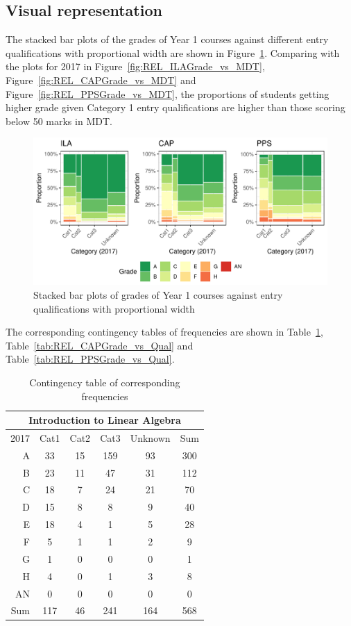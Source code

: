 \documentclass[a4paper]{report}
\begin{document}
\subsection{Visual representation}

The stacked bar plots of the grades of Year 1 courses against different entry qualifications with proportional width are shown in Figure~\ref{fig:REL_Grade_vs_Qual}. Comparing with the plots for 2017 in Figure~\ref{fig:REL_ILAGrade_vs_MDT}, Figure~\ref{fig:REL_CAPGrade_vs_MDT} and Figure~\ref{fig:REL_PPSGrade_vs_MDT}, the proportions of students getting higher grade given Category 1 entry qualifications are higher than those scoring below 50 marks in MDT. 

\begin{figure}[H]
  \centering
  \includegraphics[width=\linewidth]{fig/REL_Grade_vs_Qual.pdf}
  \caption{\label{fig:REL_Grade_vs_Qual}Stacked bar plots of grades of Year 1 courses against entry qualifications with proportional width}
\end{figure}

The corresponding contingency tables of frequencies are shown in Table~\ref{tab:REL_ILAGrade_vs_Qual}, Table~\ref{tab:REL_CAPGrade_vs_Qual} and Table~\ref{tab:REL_PPSGrade_vs_Qual}. 

\begin{table}[H]
  \centering
  \begin{tabular}{r|cccc|c}
    \hline
    \multicolumn{6}{c}{\textbf{Introduction to Linear Algebra}} \\
    \hline
   2017 & Cat1 & Cat2 & Cat3 & Unknown & Sum \\ 
    \hline
  A & 33 & 15 & 159 & 93 & 300 \\ 
    B & 23 & 11 & 47 & 31 & 112 \\ 
    C & 18 & 7 & 24 & 21 & 70 \\ 
    D & 15 & 8 & 8 & 9 & 40 \\ 
    E & 18 & 4 & 1 & 5 & 28 \\ 
    F & 5 & 1 & 1 & 2 & 9 \\ 
    G & 1 & 0 & 0 & 0 & 1 \\ 
    H & 4 & 0 & 1 & 3 & 8 \\ 
    AN & 0 & 0 & 0 & 0 & 0 \\ 
    \hline
    Sum & 117 & 46 & 241 & 164 & 568 \\ 
     \hline
  \end{tabular}
  \caption{\label{tab:REL_ILAGrade_vs_Qual}Contingency table of corresponding frequencies}
\end{table}
\end{document}
